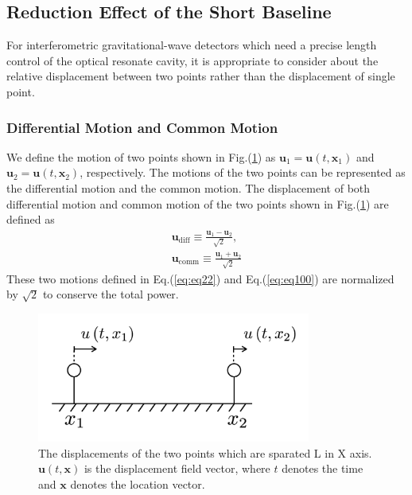 


\subsection{Reduction Effect of the Short Baseline} \label{sec:313}
For interferometric gravitational-wave detectors which need a precise length control of the optical resonate cavity, it is appropriate to consider about the relative displacement between two points rather than the displacement of single point.



\subsubsection{Differential Motion and Common Motion}
We define the motion of two points shown in Fig.(\ref{img:img310}) as $\bm{u}_1=\bm{u}(t,\bm{x}_1)$ and $\bm{u}_2=\bm{u}(t,\bm{x}_2)$, respectively. The motions of the two points can be represented as the differential motion and the common motion. The displacement of both differential motion and common motion of the two points shown in Fig.(\ref{img:img310}) are defined as
\begin{eqnarray}
  \bm{u}_{\mathrm{diff}} \equiv \frac{\bm{u}_{1}-\bm{u}_{2}}{\sqrt{2}}, \, \\ \label{eq:eq22}
  \bm{u}_{\mathrm{comm}}  \equiv \frac{\bm{u}_{1}+\bm{u}_{2}}{\sqrt{2}} \label{eq:eq100}
\end{eqnarray}
These two motions defined in Eq.(\ref{eq:eq22}) and Eq.(\ref{eq:eq100}) are normalized by $\sqrt{2}$ to conserve the total power.
\begin{figure}[h]
  \begin{center}
    \includegraphics[width=9.0cm]{./img_chap3/img315.png}
    \caption{The displacements of the two points which are sparated L in X axis. $\bm{u}(t,\bm{x})$ is the displacement field vector, where $t$ denotes the time and $\bm{x}$ denotes the location vector.}\label{img:img310}    
  \end{center}
\end{figure}



